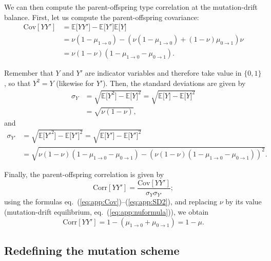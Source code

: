 \documentclass[11pt, letterpaper]{article}
\renewcommand{\eqref}[1]{\textup{{\normalfont eq.~(\ref{#1}}\normalfont)}}
\newcommand{\Esp}[1]{\mathbb{E}\big[ #1\big]}%
\newcommand{\mutbias}{\nu}
\newcommand{\Cov}[1]{\mathrm{Cov}\left[#1 \right]}
\begin{document}
We can then compute the parent-offspring type correlation at the mutation-drift balance. First, let us compute the parent-offspring covariance:
%
\begin{equation}\label{eq:app:Cov}
\begin{aligned}
\Cov{Y Y'} &= \Esp{Y Y'} - \Esp{Y'}\Esp{Y}\\
& = \mutbias (1-\mu_{1\to 0}) - \left(\mutbias (1-\mu_{1\to 0}) + (1-\mutbias) \mu_{0\to 1}\right) \mutbias \\
%
& = \mutbias (1-\mutbias) (1 - \mu_{1\to 0} - \mu_{0\to 1}).
\end{aligned}
\end{equation}

Remember that $Y$ and $Y'$ are indicator variables and therefore take value in $\{0, 1\}$, so that $Y^2 = Y$ (likewise for $Y'$). Then, the standard deviations are given by 
\begin{equation}\label{eq:app:SD1}
\begin{aligned}
\sigma_Y &= \sqrt{\Esp{Y^2} - \Esp{Y}^2} = \sqrt{\Esp{Y} - \Esp{Y}^2} \\
& = \sqrt{\mutbias (1-\mutbias)},
\end{aligned}
\end{equation}
and
\begin{equation}\label{eq:app:SD2}
\begin{aligned}
\sigma_{Y'} &= \sqrt{\Esp{Y'^2} - \Esp{Y'}^2}  = \sqrt{\Esp{Y'} - \Esp{Y'}^2} \\
& = \sqrt{\mutbias (1-\mutbias) (1 - \mu_{1\to 0} - \mu_{0\to 1}) - (\mutbias (1-\mutbias) (1 - \mu_{1\to 0} - \mu_{0\to 1}))^2}.
\end{aligned}
\end{equation}

Finally, the parent-offspring correlation is given by 
\begin{displaymath}
\mathrm{Corr}\left[Y Y' \right] = \frac{\Cov{Y Y'}}{\sigma_Y \sigma_{Y'}};
\end{displaymath}
using the formulas \eqref{eq:app:Cov}--(\ref{eq:app:SD2}), and replacing $\mutbias$ by its value (mutation-drift equilibrium, \eqref{eq:app:nuformula}), we obtain
\begin{equation}\label{eq:app:mudef}
\mathrm{Corr}\left[ Y Y' \right] = 1 - (\mu_{1\to 0} + \mu_{0\to 1})= 1-\mu.
\end{equation}

\subsection{Redefining the mutation scheme\label{sec:app:mutnew}}
\end{document}
